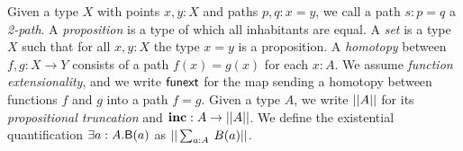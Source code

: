Given a type $X$ with points $x, y : X$ and paths $p, q : x = y$, we call a path $s : p = q$ a \emph{2-path}.
A \emph{proposition} is a type of which all inhabitants are equal.
A \emph{set} is a type $X$ such that for all $x, y : X$ the type $x = y$ is a proposition.
A \emph{homotopy} between $f, g : X \rightarrow Y$ consists of a path
$f(x) = g(x)$ for each $x : A$. We assume \emph{function
extensionality}, and we write $\mathsf{funext}$ for the map sending a
homotopy between functions $f$ and $g$ into a path $f = g$. Given a
type $A$, we write $|| A ||$ for its \emph{propositional truncation}
and $\operatorname{\mathbf{inc}} : A \to || A ||$. We define the existential quantification
$\exists a : A.\mathsf{B}(a)$ as $\PT{\Sum {a : A}. B(a)}$.
